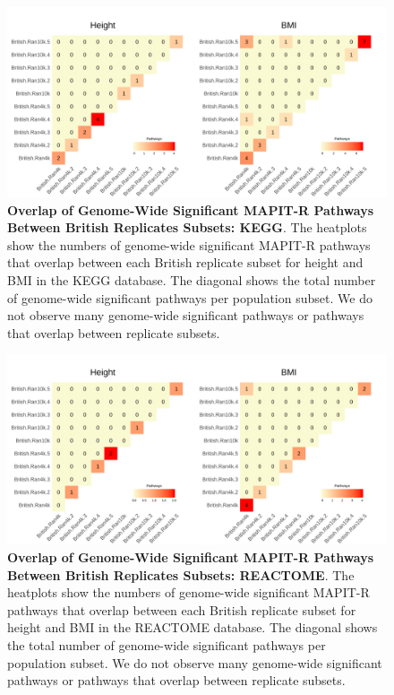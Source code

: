 \documentclass[12pt, a4paper]{article}
\begin{document}
\setcounter{CharNumber4}{1}
\renewcommand{\thefigure}{\arabic{figure}\alph{CharNumber4}}
\begin{landscape}
\begin{figure}[htbp]
\centering
\includegraphics[scale=.2]{Images/Supp/InterPath_Supp_Figure_BritReps_Heatplots_KEGG_vs3.png}
\caption[TBD]{\textbf{Overlap of Genome-Wide Significant MAPIT-R Pathways Between British Replicates Subsets: KEGG}. The heatplots show the numbers of genome-wide significant MAPIT-R pathways that overlap between each British replicate subset for height and BMI in the KEGG database. The diagonal shows the total number of genome-wide significant pathways per population subset. We do not observe many genome-wide significant pathways or pathways that overlap between replicate subsets.}
\label{InterPath-Supp-Figure-BritReps-Heatplots-AllPaths}
\end{figure}
\clearpage
\addtocounter{figure}{-1}
\addtocounter{CharNumber4}{1}
\end{landscape}

\begin{landscape}
\begin{figure}[htbp]
\centering
\includegraphics[scale=.2]{Images/Supp/InterPath_Supp_Figure_BritReps_Heatplots_REACTOME_vs3.png}
\caption[TBD]{\textbf{Overlap of Genome-Wide Significant MAPIT-R Pathways Between British Replicates Subsets: REACTOME}. The heatplots show the numbers of genome-wide significant MAPIT-R pathways that overlap between each British replicate subset for height and BMI in the REACTOME database. The diagonal shows the total number of genome-wide significant pathways per population subset. We do not observe many genome-wide significant pathways or pathways that overlap between replicate subsets.}
\label{InterPath-Supp-Figure-BritReps-Heatplots-AllPaths}
\end{figure}
\clearpage
\renewcommand{\thefigure}{\arabic{figure}}
\end{landscape}
\end{document}
